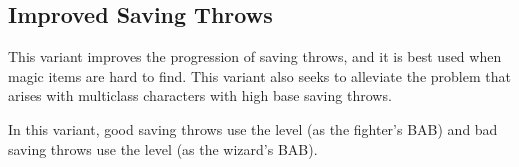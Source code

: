 \subsection{Improved Saving Throws}
This variant improves the progression of saving throws, and it is best used when magic items are hard to find. This variant also seeks to alleviate the problem that arises with multiclass characters with high base saving throws.

In this variant, good saving throws use the level (as the fighter's BAB) and bad saving throws use \onehalf the level (as the wizard's BAB).


